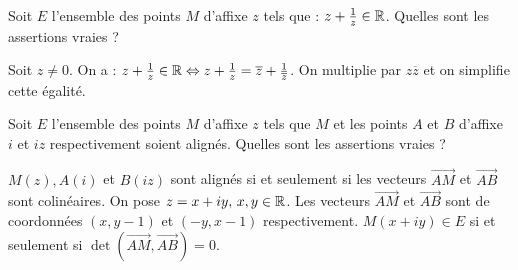 \begin{question} 

Soit $E$ l'ensemble des points $M$ d'affixe $z$ tels que : $z+\frac{1}{z} \in \mathbb{R}$. Quelles sont les assertions vraies ?
\begin{answers}
    
    
    
    
    
     

\end{answers}
\begin{explanations}
Soit $z \neq 0$. On a :  $z+\frac{1}{z} \in \mathbb{R} \Leftrightarrow z+\frac{1}{z}  = \overline{z}+\frac{1}{\overline{z}}$. On multiplie par $z\overline{z}$ et on simplifie cette égalité. 

\end{explanations}

\end{question}


\begin{question} 

Soit $E$ l'ensemble des points $M$ d'affixe $z$ tels que $M$ et les points $A$ et $B$ d'affixe $i$ et $iz$ respectivement 
soient alignés. Quelles sont les assertions vraies ?
\begin{answers}
    
    
    
    
    
     

\end{answers}
\begin{explanations}
$M(z), A(i)$ et $B(iz)$ sont alignés si et seulement si les vecteurs $\overrightarrow{AM}$ et $\overrightarrow{AB}$
sont colinéaires. On pose $z=x+iy, \, x,y\in \mathbb{R}$. Les vecteurs $\overrightarrow{AM}$ et $\overrightarrow{AB}$ sont de coordonnées $(x,y-1)$ et $(-y,x-1)$ respectivement. $M(x+iy) \in E$ si et seulement si  $\det(\overrightarrow{AM},   \overrightarrow{AB})=0$. 

\end{explanations}

\end{question}




